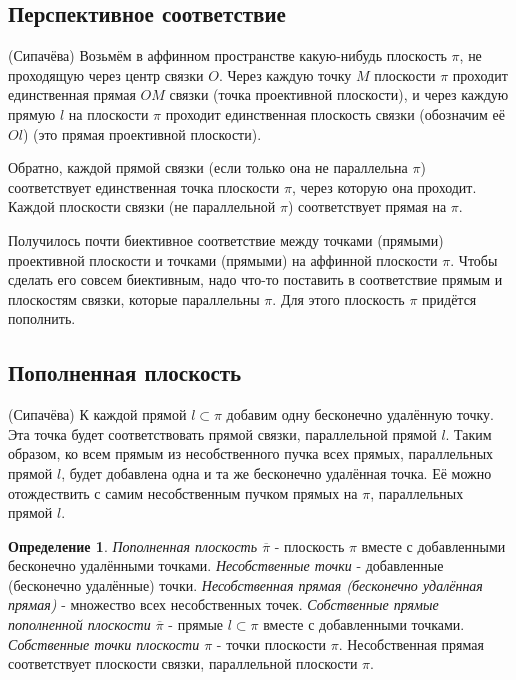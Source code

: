 \documentclass[a4paper, 12pt]{article}
\theoremstyle{definition}
\newtheorem*{definition}{Определение}
\begin{document}
\subsection{Перспективное соответствие}
(Сипачёва) Возьмём в аффинном пространстве какую-нибудь плоскость $\pi$, не проходящую через центр связки $O$. Через каждую точку $M$ плоскости $\pi$ проходит единственная прямая $OM$ связки (точка проективной плоскости), и через каждую прямую $l$ на плоскости $\pi$ проходит единственная плоскость связки (обозначим её $Ol$) (это прямая проективной плоскости).

Обратно, каждой прямой связки (если только она не параллельна $\pi$) соответствует единственная точка плоскости $\pi$, через которую она проходит. Каждой плоскости связки (не параллельной $\pi$) соответствует прямая на $\pi$.

Получилось почти биективное соответствие между точками (прямыми) проективной плоскости и точками (прямыми) на аффинной плоскости $\pi$. Чтобы сделать его совсем биективным, надо что-то поставить в соответствие прямым и плоскостям связки, которые параллельны $\pi$. Для этого плоскость $\pi$ придётся пополнить.


\subsection{Пополненная плоскость}
(Сипачёва) К каждой прямой $l \subset \pi$ добавим одну бесконечно удалённую точку. Эта точка будет соответствовать прямой связки, параллельной прямой $l$. Таким образом, ко всем прямым из несобственного пучка всех прямых, параллельных прямой $l$, будет добавлена одна и та же бесконечно удалённая точка. Её можно отождествить с самим несобственным пучком прямых на $\pi$, параллельных прямой $l$.

\begin{definition}
    \textit{Пополненная плоскость $\overline{\pi}$} - плоскость $\pi$ вместе с добавленными бесконечно удалёнными точками. \newline 
    \textit{Несобственные точки} - добавленные (бесконечно удалённые) точки. \newline
    \textit{Несобственная прямая (бесконечно удалённая прямая)} - множество всех несобственных точек. \newline
    \textit{Собственные прямые пополненной плоскости $\overline{\pi}$} - прямые $l \subset \pi$ вместе с добавленными точками. \newline
    \textit{Собственные точки плоскости $\pi$} - точки плоскости $\pi$. Несобственная прямая соответствует плоскости связки, параллельной плоскости $\pi$.
\end{definition}
\end{document}
